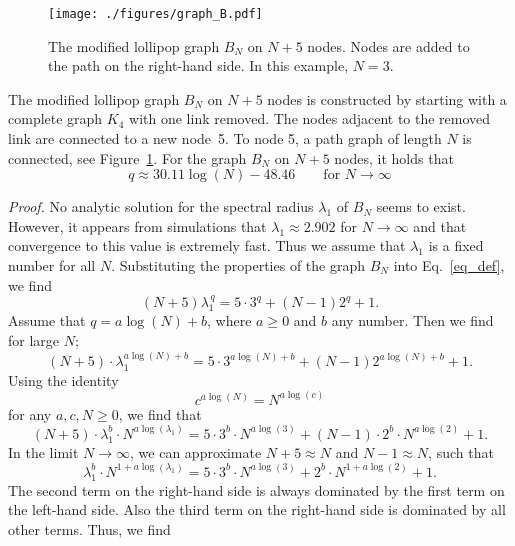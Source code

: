 \documentclass{comnet}%
\begin{document}
\begin{figure}[!ht]
	\centering
	\texttt{[image: ./figures/graph\_B.pdf]}
	\caption{The modified lollipop graph $B_N$ on $N+5$ nodes. Nodes are added to the path on the right-hand side. In this example, $N=3$.}
	\label{fig_graph_B}
\end{figure}
\begin{theorem}
	The modified lollipop graph $B_N$ on $N+5$ nodes is constructed by starting with a complete graph $K_4$ with one link removed. The nodes adjacent to the removed link are connected to a new node~5. To node 5, a path graph of length $N$ is connected, see Figure~\ref{fig_graph_B}. For the graph $B_N$ on $N+5$ nodes, it holds that
	\begin{equation}\label{eq_q_medal}
		q \approx 30.11 \log(N) - 48.46 \qquad \text{for } N \to \infty
	\end{equation}
\end{theorem}
\textit{Proof.} No analytic solution for the spectral radius $\lambda_1$ of $B_N$ seems to exist. However, it appears from simulations that $\lambda_1 \approx 2.902$ for $N \to \infty$ and that convergence to this value is extremely fast. Thus we assume that $\lambda_1$ is a fixed number for all $N$. Substituting the properties of the graph $B_N$ into Eq.~\eqref{eq_def}, we find
\begin{equation*}
	(N+5) \lambda_1^{\, q} = 5 \cdot 3^q + (N-1) 2^q + 1.
\end{equation*}
Assume that $q = a \log(N) + b$, where $a \geq 0$ and $b$ any number. Then we find for large $N$;
\begin{equation*}
	(N+5) \cdot \lambda_1^{a \log(N) + b} = 5 \cdot 3^{a \log(N) + b} + (N-1) 2^{a \log(N) + b} + 1.
\end{equation*}
Using the identity
\begin{equation*}
	c^{a \log(N)} = N^{a \log(c)}
\end{equation*}
for any $a,c,N \geq 0$, we find that
\begin{equation*}
	(N+5) \cdot \lambda_1^b \cdot N^{a \log(\lambda_1)} = 5 \cdot 3^b \cdot N^{a \log(3)} + (N-1) \cdot 2^b \cdot N^{a \log(2)} + 1.
\end{equation*}
In the limit $N\to\infty$, we can approximate $N+5 \approx N$ and $N-1 \approx N$, such that
\begin{equation*}
	\lambda_1^b \cdot N^{1+a \log(\lambda_1)} = 5 \cdot 3^b \cdot N^{a \log(3)} + 2^b \cdot N^{1+a \log(2)} + 1.
\end{equation*}
The second term on the right-hand side is always dominated by the first term on the left-hand side. Also the third term on the right-hand side is dominated by all other terms. Thus, we find
\end{document}

